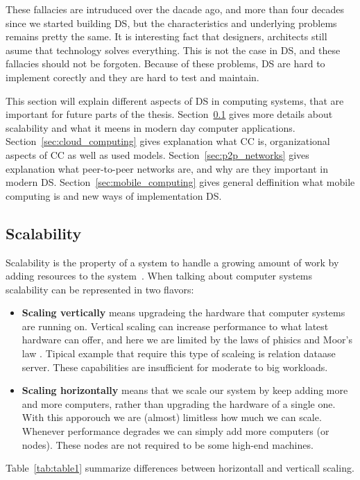 These fallacies are intruduced over the dacade ago, and more than four decades since we started building DS, but the characteristics and underlying problems remains pretty the same. It is interesting fact that designers, architects still asume that technology solves everything. This is not the case in DS, and these fallacies should not be forgoten. Because of these problems, DS are hard to implement corectly and they are hard to test and maintain.

This section will explain different aspects of DS in computing systems, that are important for future parts of the thesis. Section~\ref{sec:scalability} gives more details about scalability and what it meens in modern day computer applications. Section~\ref{sec:cloud_computing} gives explanation what CC is, organizational aspects of CC as well as used models. Section~\ref{sec:p2p_networks} gives explanation what peer-to-peer networks are, and why are they important in modern DS. Section~\ref{sec:mobile_computing} gives general deffinition what mobile computing is and new ways of implementation DS.
%
%
\subsection{Scalability}\label{sec:scalability}
%
Scalability is the property of a system to handle a growing amount of work by adding resources to the system~\cite{Bondi00}. When talking about computer systems scalability can be represented in two flavors:

\begin{itemize}
	\item \textbf{Scaling vertically} means upgradeing the hardware that computer systems are running on. Vertical scaling can increase performance to what latest hardware can offer, and here we are limited by the laws of phisics and Moor's law \cite{Gustafson2011}. Tipical example that require this type of scaleing is relation dataase server. These capabilities are insufficient for moderate to big workloads.
	\item \textbf{Scaling horizontally} means that we scale our system by keep adding more and more computers, rather than upgrading the hardware of a single one. With this apporouch we are (almost) limitless how much we can scale. Whenever performance degrades we can simply add more computers (or nodes). These nodes are not required to be some high-end machines.
\end{itemize}

Table~\ref{tab:table1} summarize differences between horizontall and verticall scaling.

